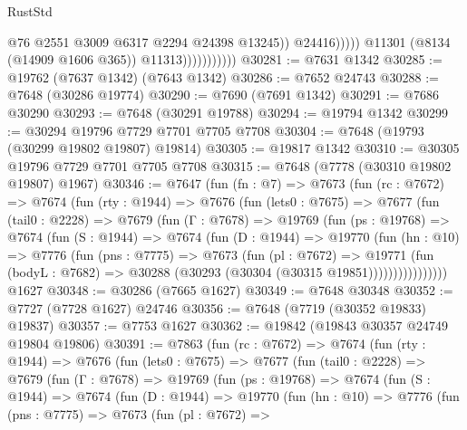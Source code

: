 \begin{lexlean}{RustStd}
\begin{coremodule}
{\begin{coremodule}
{{{{{{{{{{{{{{{{{{{{{{{{{{{{{{{{{{{{{{{{{{{{{{{{{{{{{                                        @76
                                        @2551
                                        @3009
                                        @6317
                                        @2294
                                        @24398
                                        @13245))
                                    @24416)))))
                          @11301
                          (@8134 (@14909 @1606 @365))
                          @11313)))))))))))
@30281 := @7631 @1342
@30285 := @19762 (@7637 @1342) (@7643 @1342)
@30286 := @7652 @24743
@30288 := @7648 (@30286 @19774)
@30290 := @7690 (@7691 @1342)
@30291 := @7686 @30290
@30293 := @7648 (@30291 @19788)
@30294 := @19794 @1342
@30299 := @30294 @19796 @7729 @7701 @7705 @7708
@30304 := @7648 (@19793 (@30299 @19802 @19807) @19814)
@30305 := @19817 @1342
@30310 := @30305 @19796 @7729 @7701 @7705 @7708
@30315 := @7648 (@7778 (@30310 @19802 @19807) @1967)
@30346 := @7647
    (fun (fn : @7) =>
    @7673
      (fun (rc : @7672) =>
      @7674
        (fun (rty : @1944) =>
        @7676
          (fun (lets0 : @7675) =>
          @7677
            (fun (tail0 : @2228) =>
            @7679
              (fun (Γ : @7678) =>
              @19769
                (fun (ps : @19768) =>
                @7674
                  (fun (S : @1944) =>
                  @7674
                    (fun (D : @1944) =>
                    @19770
                      (fun (hn : @10) =>
                      @7776
                        (fun (pns : @7775) =>
                        @7673
                          (fun (pl : @7672) =>
                          @19771
                            (fun (bodyL : @7682) =>
                            @30288 (@30293 (@30304 (@30315 @19851))))))))))))))))
    @1627
@30348 := @30286 (@7665 @1627)
@30349 := @7648 @30348
@30352 := @7727 (@7728 @1627) @24746
@30356 := @7648 (@7719 (@30352 @19833) @19837)
@30357 := @7753 @1627
@30362 := @19842 (@19843 @30357 @24749 @19804 @19806)
@30391 := @7863
    (fun (rc : @7672) =>
    @7674
      (fun (rty : @1944) =>
      @7676
        (fun (lets0 : @7675) =>
        @7677
          (fun (tail0 : @2228) =>
          @7679
            (fun (Γ : @7678) =>
            @19769
              (fun (ps : @19768) =>
              @7674
                (fun (S : @1944) =>
                @7674
                  (fun (D : @1944) =>
                  @19770
                    (fun (hn : @10) =>
                    @7776
                      (fun (pns : @7775) =>
                      @7673
                        (fun (pl : @7672) =>
}}}}}}}}}}}}}}}}}}}}}}}}}}}}}}}}}}}}}}}}}}}}}}}}}}}}}
\end{coremodule}}
\end{coremodule}
\end{lexlean}
